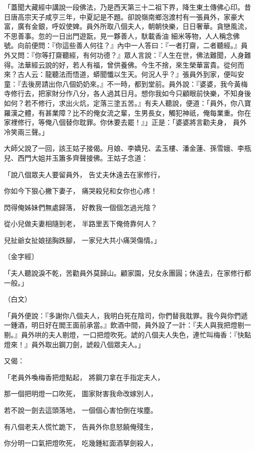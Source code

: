 \begin{showcontents}{}
「蓋聞大藏經中講說一段佛法，乃是西天第三十二祖下界，降生東土傳佛心印。昔日唐高宗天子咸亨三年，中夏記是不題。卻說嶺南鄉泡渡村有一張員外，家豪大富，廣有金銀，呼奴使婢。員外所取八個夫人，朝朝快樂，日日奢華。貪戀風流，不思善事。忽的一日出門遊翫，見一夥善人，馱載香油 細米等物，人人稱念佛號。向前便問：『你這些善人何往？』內中一人答曰：『一者打齋，二者聽經。』員外又問：『你等打齋聽經，有何功德？』眾人言說：『人生在世，佛法難聞，人身難得。法華經云說的好，若人有福，曾供養佛。今生不捨，來生榮華富貴。從何而來？古人云：龍聽法而悟道，蟒聞懺以生天。何況人乎？』張員外到家，便叫安童：『去後房請出你八個奶奶來。』不一時，都到堂前。員外說：『婆婆，我今黃梅寺修行去，把家財分作八分，各人過其日月。想你我如今只顧眼前快樂，不知身後如何？若不修行，求出火炕，定落三塗五苦。』有夫人聽說，便道：「員外，你八寶羅漢之體，有甚業障？比不的俺女流之輩，生男長女，觸犯神祇，俺每業重。你在家裡修行，等俺八個替你耽罪。你休要去罷！』」正是：「婆婆將言勸夫身，  員外冷笑兩三聲。」

大師父說了一回，該王姑子接偈。月娘、李嬌兒、孟玉樓、潘金蓮、孫雪娥、李瓶兒、西門大姐并玉簫多齊聲接佛。王姑子念道：

「說八個眾夫人要留員外，  告丈夫休遠去在家修行，

你如今下狠心撇下妻子，  痛哭殺兒和女你也心疼！

閃得俺姊妹們無處歸落，  好教我一個個怎過光陰？

從小兒做夫妻相隨到老，  半路里丟下俺倚靠何人？

兒扯爺女扯娘搥胸跌腳，  一家兒大共小痛哭傷情。」

〔金字經〕

「夫人聽說淚不乾，苦勸員外莫歸山。顧家園，兒女永團圓；休遠去，在家修行都一般。」

（白文）

「員外便說：『多謝你八個夫人，我明白死在陰司，你們替我耽罪。我今與你們遞一鍾酒，明日好在閻王面前承當。』飲酒中間，員外設了一計：『夫人與我把燈剔一剔。』員外哄的夫人剔燈，一口把燈吹死。諕的八個夫人失色，連忙叫梅香：『快點燈來！』員外取出鋼刀劍，諕殺八個眾夫人。」

又偈：

「老員外喚梅香把燈點起，  將鋼刀拿在手指定夫人，

那一個把明燈一口吹死，  圖家財害我命改嫁別人，

若不說一劍去這頭落地，  一個個心害怕倒在埃塵。

有八個老夫人慌忙跪下，  告員外你息怒饒俺殘生，

你分明一口氣把燈吹死，  吃幾鍾紅面酒拏劍殺人，


\end{showcontents}
